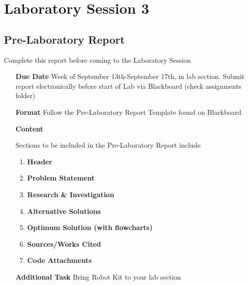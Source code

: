 \chapter{Laboratory Session 3}
\section{Pre-Laboratory Report}
	Complete this report before coming to the Laboratory Session
\begin{itemize}
	\item[\textbf{Due Date}]{Week of September 13th-September 17th, \the\year \space in lab section. Submit report electronically before start of Lab via Blackboard (check assignments folder)}
	\item[\textbf{Format}]{Follow the Pre-Laboratory Report Template found on Blackboard}
	\item[\textbf{Content}]{Sections to be included in the Pre-Laboratory Report include
		\begin{enumerate}
			\item \textbf{Header}
			\item \textbf{Problem Statement}
			\item \textbf{Research \& Investigation}
			\item \textbf{Alternative Solutions}
			\item \textbf{Optimum Solution (with flowcharts)}
			\item \textbf{Sources/Works Cited}
			\item \textbf{Code Attachments}
		\end{enumerate}
		
	}
	\item[\textbf{Additional Task}]{Bring Robot Kit to your lab section}
\end{itemize}
